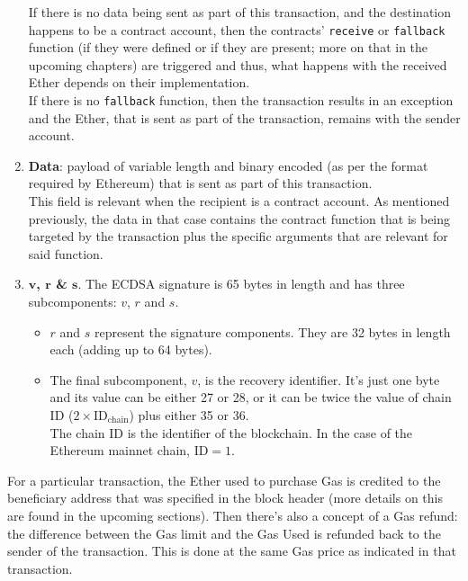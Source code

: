 \begin{enumerate}
    If there is no data being sent as part of this transaction, and the destination happens to be a contract account, then the contracts' \texttt{receive} or \texttt{fallback} function (if they were defined or if they are present; more on that in the upcoming chapters) are triggered and thus, what happens with the received Ether depends on their implementation.\\
    
    If there is no \texttt{fallback} function, then the transaction results in an exception and the Ether, that is sent as part of the transaction, remains with the sender account.

    \item\textbf{Data}: payload of variable length and binary encoded (as per the format required by Ethereum) that is sent as part of this transaction.\\
    
    This field is relevant when the recipient is a contract account. As mentioned previously, the data in that case contains the contract function that is being targeted by the transaction plus the specific arguments that are relevant for said function.

    \item\textbf{$\boldsymbol{v}$, $\boldsymbol{r}$ \& $\boldsymbol{s}$}. The ECDSA signature is 65 bytes in length and has three subcomponents: $v$, $r$ and $s$.
    
    \begin{itemize}
        
        \item $r$ and $s$ represent the signature components.
        They are 32 bytes in length each (adding up to 64 bytes).

        \item The final subcomponent, $v$, is the recovery identifier.
        It's just one byte and its value can be either 27 or 28, or it can be twice the value of chain ID ($2\times\text{ID}_\text{chain}$) plus either 35 or 36.\\

        The chain ID is the identifier of the blockchain.
        In the case of the Ethereum mainnet chain, $\text{ID}=1$.

    \end{itemize}
    
\end{enumerate}

For a particular transaction, the Ether used to purchase Gas is credited to the beneficiary address that was specified in the block header (more details on this are found in the upcoming sections).
Then there's also a concept of a Gas refund: the difference between the Gas limit and the Gas Used is refunded back to the sender of the transaction.
This is done at the same Gas price as indicated in that transaction.


